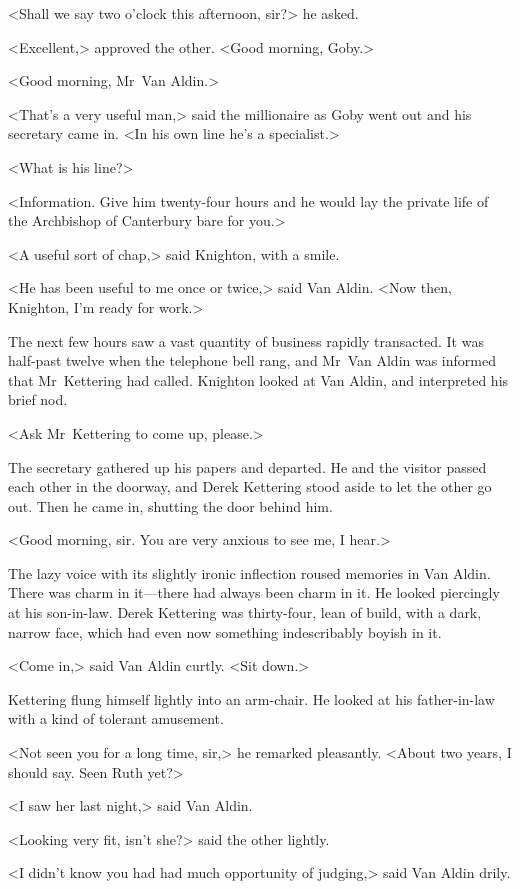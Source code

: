 <Shall we say two o'clock this afternoon, sir?> he asked.

<Excellent,> approved the other. <Good morning, Goby.>

<Good morning, Mr~Van Aldin.>

<That's a very useful man,> said the millionaire as Goby went out and his secretary came in. <In his own line he's a specialist.>

<What is his line?>

<Information. Give him twenty-four hours and he would lay the private life of the Archbishop of Canterbury bare for you.>

<A useful sort of chap,> said Knighton, with a smile.

<He has been useful to me once or twice,> said Van Aldin. <Now then, Knighton, I'm ready for work.>

The next few hours saw a vast quantity of business rapidly transacted. It was half-past twelve when the telephone bell rang, and Mr~Van Aldin was informed that Mr~Kettering had called. Knighton looked at Van Aldin, and interpreted his brief nod.

<Ask Mr~Kettering to come up, please.>

The secretary gathered up his papers and departed. He and the visitor passed each other in the doorway, and Derek Kettering stood aside to let the other go out. Then he came in, shutting the door behind him.

<Good morning, sir. You are very anxious to see me, I hear.>

The lazy voice with its slightly ironic inflection roused memories in Van Aldin. There was charm in it—there had always been charm in it. He looked piercingly at his son-in-law. Derek Kettering was thirty-four, lean of build, with a dark, narrow face, which had even now something indescribably boyish in it.

<Come in,> said Van Aldin curtly. <Sit down.>

Kettering flung himself lightly into an arm-chair. He looked at his father-in-law with a kind of tolerant amusement.

<Not seen you for a long time, sir,> he remarked pleasantly. <About two years, I should say. Seen Ruth yet?>

<I saw her last night,> said Van Aldin.

<Looking very fit, isn't she?> said the other lightly.

<I didn't know you had had much opportunity of judging,> said Van Aldin drily.

